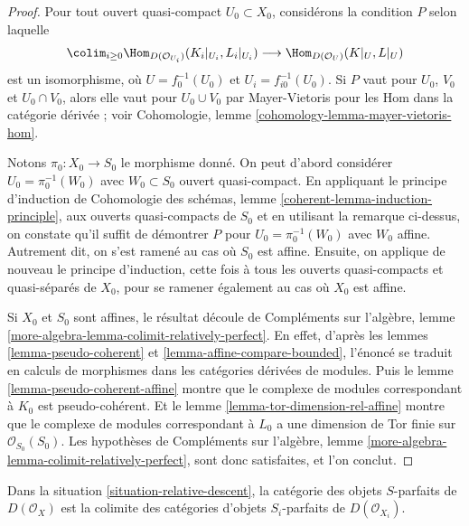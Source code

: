 \begin{proof}
Pour tout ouvert quasi-compact $U_0 \subset X_0$, considérons la
condition $P$ selon laquelle
$$
\colim_{i \geq 0} \Hom_{D(\mathcal{O}_{U_i})}(K_i|_{U_i}, L_i|_{U_i})
\longrightarrow
\Hom_{D(\mathcal{O}_U)}(K|_U, L|_U)
$$
est un isomorphisme, où $U = f_0^{-1}(U_0)$ et $U_i = f_{i0}^{-1}(U_0)$.
Si $P$ vaut pour $U_0$, $V_0$ et $U_0 \cap V_0$, alors elle vaut
pour $U_0 \cup V_0$ par Mayer-Vietoris
pour les Hom dans la catégorie dérivée ; voir
Cohomologie, lemme \ref{cohomology-lemma-mayer-vietoris-hom}.

\medskip\noindent
Notons $\pi_0 : X_0 \to S_0$ le morphisme donné.
On peut d'abord considérer $U_0 = \pi_0^{-1}(W_0)$ avec
$W_0 \subset S_0$ ouvert quasi-compact. En appliquant le principe d'induction de
Cohomologie des schémas, lemme \ref{coherent-lemma-induction-principle},
aux ouverts quasi-compacts de $S_0$
et en utilisant la remarque ci-dessus, on constate qu'il suffit de démontrer
$P$ pour $U_0 = \pi_0^{-1}(W_0)$ avec $W_0$ affine.
Autrement dit, on s'est ramené au cas où $S_0$ est affine.
Ensuite, on applique de nouveau le principe d'induction, cette fois à tous les
ouverts quasi-compacts et quasi-séparés de $X_0$, pour se ramener également au
cas où $X_0$ est affine.

\medskip\noindent
Si $X_0$ et $S_0$ sont affines, le résultat découle de
Compléments sur l'algèbre, lemme \ref{more-algebra-lemma-colimit-relatively-perfect}.
En effet, d'après les lemmes \ref{lemma-pseudo-coherent} et
\ref{lemma-affine-compare-bounded},
l'énoncé se traduit en calculs de morphismes dans les
catégories dérivées de modules. Puis le
lemme \ref{lemma-pseudo-coherent-affine}
montre que le complexe de modules correspondant à $K_0$
est pseudo-cohérent. Et le
lemme \ref{lemma-tor-dimension-rel-affine}
montre que le complexe de modules correspondant à $L_0$
a une dimension de Tor finie sur $\mathcal{O}_{S_0}(S_0)$.
Les hypothèses de
Compléments sur l'algèbre, lemme \ref{more-algebra-lemma-colimit-relatively-perfect},
sont donc satisfaites, et l'on conclut.
\end{proof}

\begin{lemma}
\label{lemma-descend-relatively-perfect}
Dans la situation \ref{situation-relative-descent}, la catégorie des
objets $S$-parfaits de $D(\mathcal{O}_X)$ est la colimite des catégories
d'objets $S_i$-parfaits de $D(\mathcal{O}_{X_i})$.
\end{lemma}


